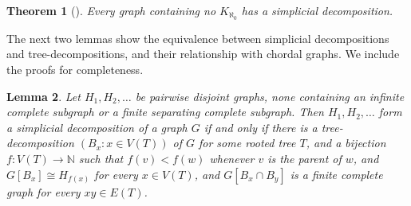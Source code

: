 \documentclass[a4paper,11pt]{article}
\theoremstyle{plain}
\newtheorem{thm}{Theorem}[section]
\newtheorem{lem}[thm]{Lemma}
\theoremstyle{definition}
\newcommand{\NN}{\mathbb{N}}
\begin{document}
\begin{thm}[\citep{Halin64a}]
\label{HalinsTheorem}
Every graph containing no $K_{\aleph_0}$ has a simplicial decomposition. 
\end{thm}

The next two lemmas show the equivalence between simplicial decompositions and tree-decompositions, and their relationship with chordal graphs. We include the proofs for completeness. 

\begin{lem}
\label{SimpDecTreeDec}
Let $H_1,H_2, \ldots$ be pairwise disjoint graphs, none containing an infinite complete subgraph or a finite separating complete subgraph. Then $H_1,H_2, \ldots$  form a simplicial decomposition of a graph $G$ if and only if there is a tree-decomposition $(B_x:x\in V(T))$ of $G$ for some rooted tree $T$, and a bijection $f:V(T)\to\NN$ such that $f(v)<f(w)$ whenever $v$ is the parent of $w$, and $G[B_x]\cong H_{f(x)}$ for every $x\in V(T)$, and $G[B_x \cap B_y]$ is a finite complete graph for every $xy\in E(T)$.
\end{lem}
\end{document}
